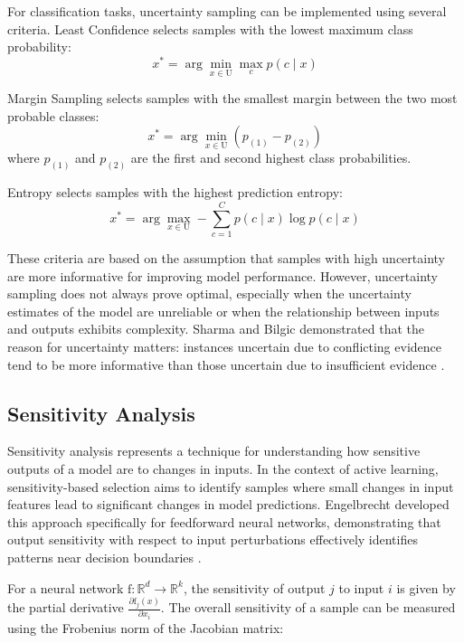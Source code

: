 \documentclass[conference]{IEEEtran}
\newcommand{\set}[1]{\mathrm{#1}}  %
\newcommand{\func}[1]{\mathrm{#1}} %
\begin{document}
For classification tasks, uncertainty sampling can be implemented using several criteria. Least Confidence selects samples with the lowest maximum class probability:
\begin{equation}
x^* = \arg\min_{x \in \set{U}} \max_c p(c \mid x)
\end{equation}

Margin Sampling selects samples with the smallest margin between the two most probable classes:
\begin{equation}
x^* = \arg\min_{x \in \set{U}} (p_{(1)} - p_{(2)})
\end{equation}
where $p_{(1)}$ and $p_{(2)}$ are the first and second highest class probabilities.

Entropy selects samples with the highest prediction entropy:
\begin{equation}
x^* = \arg\max_{x \in \set{U}} -\sum_{c=1}^C p(c \mid x) \log p(c \mid x)
\end{equation}

These criteria are based on the assumption that samples with high uncertainty are more informative for improving model performance. However, uncertainty sampling does not always prove optimal, especially when the uncertainty estimates of the model are unreliable or when the relationship between inputs and outputs exhibits complexity. Sharma and Bilgic demonstrated that the reason for uncertainty matters: instances uncertain due to conflicting evidence tend to be more informative than those uncertain due to insufficient evidence \cite{sharma2016evidence}.

\subsection{Sensitivity Analysis}

Sensitivity analysis represents a technique for understanding how sensitive outputs of a model are to changes in inputs. In the context of active learning, sensitivity-based selection aims to identify samples where small changes in input features lead to significant changes in model predictions. Engelbrecht developed this approach specifically for feedforward neural networks, demonstrating that output sensitivity with respect to input perturbations effectively identifies patterns near decision boundaries \cite{engelbrecht2001sensitivity}.

For a neural network $\func{f}: \mathbb{R}^d \rightarrow \mathbb{R}^k$, the sensitivity of output $j$ to input $i$ is given by the partial derivative $\frac{\partial \func{f}_j(x)}{\partial x_i}$. The overall sensitivity of a sample can be measured using the Frobenius norm of the Jacobian matrix:
\end{document}
